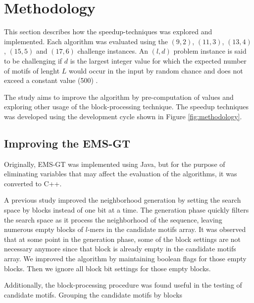 \section{Methodology}
This section describes how the speedup-techniques was explored and implemented. Each algorithm was evaluated using the $(9, 2)$, $(11, 3)$, $(13, 4)$, $(15, 5)$ and $(17, 6)$ challenge instances. An $(l, d)$ problem instance is said to be challenging if $d$ is the largest integer value for which the expected number of motifs of lenght $L$ would occur in the input by random chance and does not exceed a constant value (500) \cite{pms2015}.



The study aims to improve the algorithm by pre-computation of values and exploring other usage of the block-processing technique. The speedup techniques was developed using the development cycle shown in Figure \ref{fig:methodology}.

\subsection{Improving the EMS-GT}
Originally, EMS-GT was implemented using Java, but for the purpose of eliminating variables that may affect the evaluation of the algorithms, it was converted to C++. 

A previous study \cite{sia2015} improved the neighborhood generation by setting the search space by blocks instead of one bit at a time. The generation phase quickly filters the search space as it process the neighborhood of the sequence, leaving numerous empty blocks of $l$-mers in the candidate motifs array. It was observed that at some point in the generation phase, some of the block settings are not necessary anymore since that block is already empty in the candidate motifs array. We improved the algorithm by maintaining boolean flags for those empty blocks. Then we ignore all block bit settings for those empty blocks.

Additionally, the block-processing procedure was found useful in the testing of candidate motifs. Grouping the candidate motifs by blocks 






